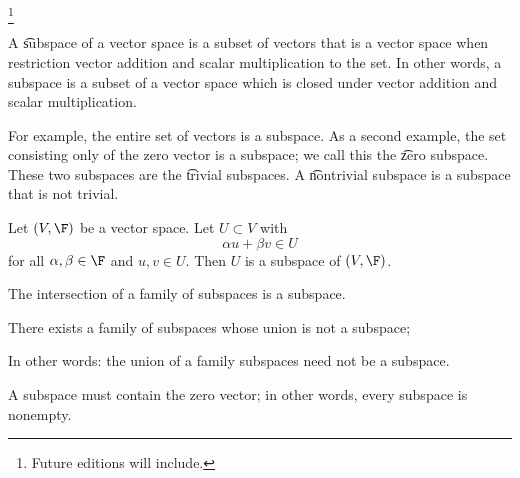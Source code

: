 
  \ifhmode\unskip\fi\footnote{
Future editions will include.
  }


A \t{subspace} of a vector space is a subset of vectors that is a vector space when restriction vector addition and scalar multiplication to the set.
In other words, a subspace is a subset of a vector space which is closed under vector addition and scalar multiplication.

For example, the entire set of vectors is a subspace.
As a second example, the set consisting only of the zero vector is a subspace; we call this the \t{zero subspace}.
These two subspaces are the \t{trivial subspaces}.
A \t{nontrivial subspace} is a subspace that is not trivial.


Let $(V, \F)$ be a vector space.
Let $U \subset V$ with
  \[
\alpha  u + \beta  v \in U
  \]
for all $\alpha , \beta  \in \F$ and $u, v \in U$.
Then $U$ is a subspace of $(V, \F)$.


\begin{prop}
The intersection of a family of subspaces is a subspace.
\end{prop}

\begin{prop}
There exists a family of subspaces whose union is not a subspace;

\begin{remark}
In other words: the union of a family subspaces need not be a subspace.
\end{remark}
\end{prop}

\begin{prop}
A subspace must contain the zero vector; in other words, every subspace is nonempty.
\end{prop}
